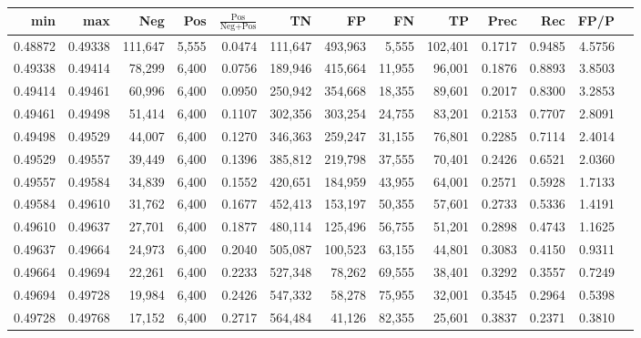 \begin{tabular}{rrrrrrrrrrrrr}
\toprule
    min &     max &     Neg &   Pos & $\frac{\text{Pos}}{\text{Neg}+\text{Pos}}$ &      TN &      FP &      FN &      TP &   Prec &    Rec &   FP/P \\
\midrule
0.48872 & 0.49338 & 111,647 & 5,555 &                                     0.0474 & 111,647 & 493,963 &   5,555 & 102,401 & 0.1717 & 0.9485 & 4.5756 \\
0.49338 & 0.49414 &  78,299 & 6,400 &                                     0.0756 & 189,946 & 415,664 &  11,955 &  96,001 & 0.1876 & 0.8893 & 3.8503 \\
0.49414 & 0.49461 &  60,996 & 6,400 &                                     0.0950 & 250,942 & 354,668 &  18,355 &  89,601 & 0.2017 & 0.8300 & 3.2853 \\
0.49461 & 0.49498 &  51,414 & 6,400 &                                     0.1107 & 302,356 & 303,254 &  24,755 &  83,201 & 0.2153 & 0.7707 & 2.8091 \\
0.49498 & 0.49529 &  44,007 & 6,400 &                                     0.1270 & 346,363 & 259,247 &  31,155 &  76,801 & 0.2285 & 0.7114 & 2.4014 \\
0.49529 & 0.49557 &  39,449 & 6,400 &                                     0.1396 & 385,812 & 219,798 &  37,555 &  70,401 & 0.2426 & 0.6521 & 2.0360 \\
0.49557 & 0.49584 &  34,839 & 6,400 &                                     0.1552 & 420,651 & 184,959 &  43,955 &  64,001 & 0.2571 & 0.5928 & 1.7133 \\
0.49584 & 0.49610 &  31,762 & 6,400 &                                     0.1677 & 452,413 & 153,197 &  50,355 &  57,601 & 0.2733 & 0.5336 & 1.4191 \\
0.49610 & 0.49637 &  27,701 & 6,400 &                                     0.1877 & 480,114 & 125,496 &  56,755 &  51,201 & 0.2898 & 0.4743 & 1.1625 \\
0.49637 & 0.49664 &  24,973 & 6,400 &                                     0.2040 & 505,087 & 100,523 &  63,155 &  44,801 & 0.3083 & 0.4150 & 0.9311 \\
0.49664 & 0.49694 &  22,261 & 6,400 &                                     0.2233 & 527,348 &  78,262 &  69,555 &  38,401 & 0.3292 & 0.3557 & 0.7249 \\
0.49694 & 0.49728 &  19,984 & 6,400 &                                     0.2426 & 547,332 &  58,278 &  75,955 &  32,001 & 0.3545 & 0.2964 & 0.5398 \\
0.49728 & 0.49768 &  17,152 & 6,400 &                                     0.2717 & 564,484 &  41,126 &  82,355 &  25,601 & 0.3837 & 0.2371 & 0.3810 \\

\end{tabular}
